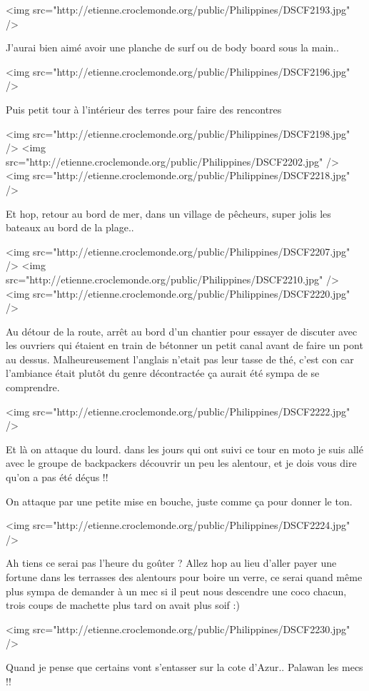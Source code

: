 <img src="http://etienne.croclemonde.org/public/Philippines/DSCF2193.jpg" />

J'aurai bien aimé avoir une planche de surf ou de body board sous la main..

<img src="http://etienne.croclemonde.org/public/Philippines/DSCF2196.jpg" />

Puis petit tour à l'intérieur des terres pour faire des rencontres

<img src="http://etienne.croclemonde.org/public/Philippines/DSCF2198.jpg" />
<img src="http://etienne.croclemonde.org/public/Philippines/DSCF2202.jpg" />
<img src="http://etienne.croclemonde.org/public/Philippines/DSCF2218.jpg" />

Et hop, retour au bord de mer, dans un village de pêcheurs, super jolis les bateaux au bord de la plage..

<img src="http://etienne.croclemonde.org/public/Philippines/DSCF2207.jpg" />
<img src="http://etienne.croclemonde.org/public/Philippines/DSCF2210.jpg" />
<img src="http://etienne.croclemonde.org/public/Philippines/DSCF2220.jpg" />

Au détour de la route, arrêt au bord d'un chantier pour essayer de discuter avec les ouvriers qui étaient en train de bétonner un petit canal avant de faire un pont au dessus. Malheureusement l'anglais n'etait pas leur tasse de thé, c'est con car l'ambiance était plutôt du genre décontractée ça aurait été sympa de se comprendre.

<img src="http://etienne.croclemonde.org/public/Philippines/DSCF2222.jpg" />

Et là on attaque du lourd. dans les jours qui ont suivi ce tour en moto je suis allé avec le groupe de backpackers découvrir un peu les alentour, et je dois vous dire qu'on a pas été déçus !!

On attaque par une petite mise en bouche, juste comme ça pour donner le ton.

<img src="http://etienne.croclemonde.org/public/Philippines/DSCF2224.jpg" />

Ah tiens ce serai pas l'heure du goûter ? Allez hop au lieu d'aller payer une fortune dans les terrasses des alentours pour boire un verre, ce serai quand même plus sympa de demander à un mec si il peut nous descendre une coco chacun, trois coups de machette plus tard on avait plus soif :)

<img src="http://etienne.croclemonde.org/public/Philippines/DSCF2230.jpg" />

Quand je pense que certains vont s'entasser sur la cote d'Azur.. Palawan les mecs !!

